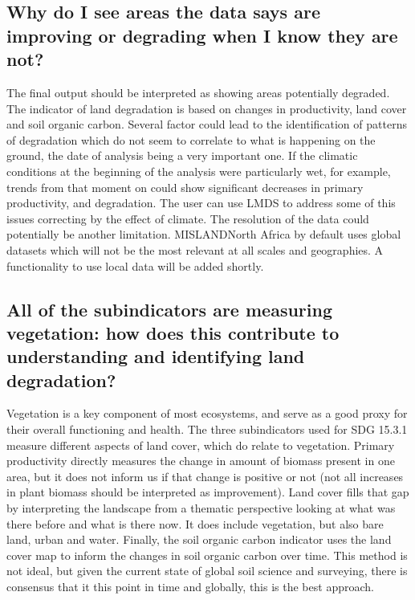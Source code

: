 \documentclass[letterpaper,10pt,english]{sphinxmanual}
\begin{document}
\subsection{Why do I see areas the data says are improving or degrading when I know they are not?}
\label{\detokenize{Introduction/faq:why-do-i-see-areas-the-data-says-are-improving-or-degrading-when-i-know-they-are-not}}
\sphinxAtStartPar
The final output should be interpreted as showing areas potentially degraded.
The indicator of land degradation is based on changes in productivity, land
cover and soil organic carbon. Several factor could lead to the identification
of patterns of degradation which do not seem to correlate to what is happening
on the ground, the date of analysis being a very important one. If the climatic
conditions at the beginning of the analysis were particularly wet, for example,
trends from that moment on could show significant decreases in primary
productivity, and degradation. The user can use LMDS to address some of
this issues correcting by the effect of climate. The resolution of the data
could potentially be another limitation. MISLAND\sphinxhyphen{}North Africa by default uses global
datasets which will not be the most relevant at all scales and geographies. A
functionality to use local data will be added shortly.


\subsection{All of the sub\sphinxhyphen{}indicators are measuring vegetation: how does this contribute to understanding and identifying land degradation?}
\label{\detokenize{Introduction/faq:all-of-the-sub-indicators-are-measuring-vegetation-how-does-this-contribute-to-understanding-and-identifying-land-degradation}}
\sphinxAtStartPar
Vegetation is a key component of most ecosystems, and serve as a good proxy for
their overall functioning and health. The three subindicators used for SDG
15.3.1 measure different aspects of land cover, which do relate to vegetation.
Primary productivity directly measures the change in amount of biomass present
in one area, but it does not inform us if that change is positive or not (not
all increases in plant biomass should be interpreted as improvement). Land
cover fills that gap by interpreting the landscape from a thematic perspective
looking at what was there before and what is there now. It does include
vegetation, but also bare land, urban and water. Finally, the soil organic
carbon indicator uses the land cover map to inform the changes in soil organic
carbon over time. This method is not ideal, but given the current state of
global soil science and surveying, there is consensus that it this point in
time and globally, this is the best approach.
\end{document}
